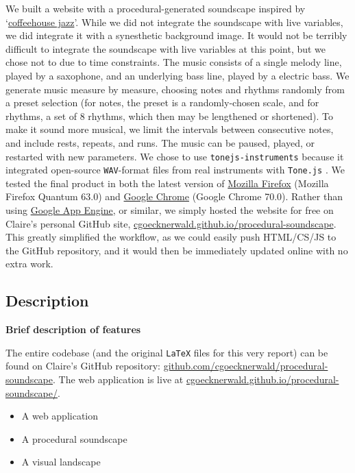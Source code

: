 \documentclass[12pt,a4paper]{article}
\newcommand{\code}{\texttt}
\newcommand{\lightcode}[1]{\colorbox{light-gray}{\texttt{#1}}}
\begin{document}
We built a website with a procedural-generated soundscape inspired by `\href{https://www.youtube.com/watch?v=K2Q6YO3Ez44}{coffeehouse jazz}'. While we did not integrate the soundscape with live variables, we did integrate it with a synesthetic background image. It would not be terribly difficult to integrate the soundscape with live variables at this point, but we chose not to due to time constraints. The music consists of a single melody line, played by a saxophone, and an underlying bass line, played by a electric bass. We generate music measure by measure, choosing notes and rhythms randomly from a preset selection (for notes, the preset is a randomly-chosen scale, and for rhythms, a set of 8 rhythms, which then may be lengthened or shortened). To make it sound more musical, we limit the intervals between consecutive notes, and include rests, repeats, and runs. The music can be paused, played, or restarted with new parameters. We chose to use \lightcode{tonejs-instruments} because it integrated open-source \code{WAV}-format files from real instruments with \lightcode{Tone.js} \cite{tonejs-instruments}. We tested the final product in both the latest version of \href{https://www.mozilla.org/en-US/firefox/}{Mozilla Firefox} (Mozilla Firefox Quantum 63.0) and \href{https://www.google.com/chrome/index.html}{Google Chrome} (Google Chrome 70.0). Rather than using \href{https://cloud.google.com/appengine/}{Google App Engine}, or similar, we simply hosted the website for free on Claire's personal GitHub site, \href{https://cgoecknerwald.github.io/procedural-soundscape}{cgoecknerwald.github.io/procedural-soundscape}. This greatly simplified the workflow, as we could easily push HTML/CS/JS to the GitHub repository, and it would then be immediately updated online with no extra work.

\subsection{Description}
\textbf{Brief description of features}

The entire codebase (and the original \code{LaTeX} files for this very report) can be found on Claire's GitHub repository: \href{https://github.com/cgoecknerwald/procedural-soundscape}{github.com/cgoecknerwald/procedural-soundscape}. The web application is live at \href{https://cgoecknerwald.github.io/procedural-soundscape/}{cgoecknerwald.github.io/procedural-soundscape/}.

\begin{itemize}
	\item A web application
	\item A procedural soundscape
	\item A visual landscape
\end{itemize}
\end{document}
